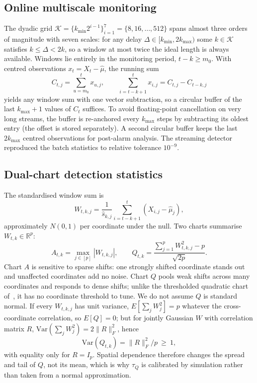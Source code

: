 \documentclass[conference]{IEEEtran}
\newcommand{\R}{\mathbb{R}}
\newcommand{\hs}{\hat{s}}
\begin{document}
\subsection{Online multiscale monitoring}
The dyadic grid $\mathcal{K}=\{k_{\min}2^{i-1}\}_{i=1}^7=\{8,16,\dots,512\}$ spans almost three orders of magnitude with seven scales: for any delay $\Delta\in[k_{\min},2k_{\max})$ some $k\in\mathcal{K}$ satisfies $k\le\Delta<2k$, so a window at most twice the ideal length is always available. Windows lie entirely in the monitoring period, $t-k\ge m_0$. With centred observations $x_t=X_t-\hat\mu$, the running sum
\begin{equation}
C_{t,j}=\sum_{u=m_0}^t x_{u,j},\qquad \sum_{i=t-k+1}^t x_{i,j}=C_{t,j}-C_{t-k,j} \label{eq:cusum}
\end{equation}
yields any window sum with one vector subtraction, so a circular buffer of the last $k_{\max}+1$ values of $C_t$ suffices. To avoid floating-point cancellation on very long streams, the buffer is re-anchored every $k_{\max}$ steps by subtracting its oldest entry (the offset is stored separately). A second circular buffer keeps the last $2k_{\max}$ centred observations for post-alarm analysis. The streaming detector reproduced the batch statistics to relative tolerance $10^{-9}$.

\subsection{Dual-chart detection statistics}
The standardised window sum is
\begin{equation}
W_{t,k,j}=\frac{1}{\hs_{k,j}}\sum_{i=t-k+1}^{t}(X_{i,j}-\hat\mu_j), \label{eq:W}
\end{equation}
approximately $N(0,1)$ per coordinate under the null. Two charts summarise $W_{t,k}\in\R^p$:
\begin{equation}
A_{t,k}=\max_{j\in[p]}|W_{t,k,j}|,\qquad Q_{t,k}=\frac{\sum_{j=1}^pW_{t,k,j}^2-p}{\sqrt{2p}}. \label{eq:charts}
\end{equation}
Chart $A$ is sensitive to sparse shifts: one strongly shifted coordinate stands out and unaffected coordinates add no noise. Chart $Q$ pools weak shifts across many coordinates and responds to dense shifts; unlike the thresholded quadratic chart of~\cite{chen2022}, it has no coordinate threshold to tune. We do not assume $Q$ is standard normal. If every $W_{t,k,j}$ has unit variance, $E[\sum_jW_j^2]=p$ whatever the cross-coordinate correlation, so $E[Q]=0$; but for jointly Gaussian $W$ with correlation matrix $R$, $\mathrm{Var}(\sum_jW_j^2)=2\|R\|_F^2$, hence
\begin{equation}
\mathrm{Var}(Q_{t,k})=\|R\|_F^2/p\ \ge\ 1, \label{eq:varQ}
\end{equation}
with equality only for $R=I_p$. Spatial dependence therefore changes the spread and tail of $Q$, not its mean, which is why $\tau_Q$ is calibrated by simulation rather than taken from a normal approximation.
\end{document}
